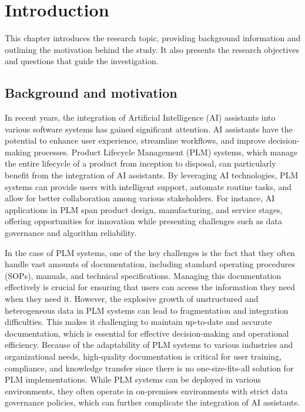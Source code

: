 \chapter{Introduction}
\label{ch:introduction}

This chapter introduces the research topic, providing background information and outlining the motivation behind the study. It also presents the research objectives and questions that guide the investigation.

\section{Background and motivation}
\label{sec:background-and-motivation}

In recent years, the integration of Artificial Intelligence (AI) assistants into various software systems has gained significant attention. AI assistants have the potential to enhance user experience, streamline workflows, and improve decision-making processes. Product Lifecycle Management (PLM) systems, which manage the entire lifecycle of a product from inception to disposal\parencite{stark_product_2015}, can particularly benefit from the integration of AI assistants. By leveraging AI technologies, PLM systems can provide users with intelligent support, automate routine tasks, and allow for better collaboration among various stakeholders. For instance, AI applications in PLM span product design, manufacturing, and service stages, offering opportunities for innovation while presenting challenges such as data governance and algorithm reliability\parencite{wang_artificial_2021}.

In the case of PLM systems, one of the key challenges is the fact that they often handle vast amounts of documentation, including standard operating procedures (SOPs), manuals, and technical specifications. Managing this documentation effectively is crucial for ensuring that users can access the information they need when they need it. However, the explosive growth of unstructured and heterogeneous data in PLM systems can lead to fragmentation and integration difficulties\parencite{wang_artificial_2021}. This makes it challenging to maintain up-to-date and accurate documentation, which is essential for effective decision-making and operational efficiency. Because of the adaptability of PLM systems to various industries and organizational needs, high-quality documentation is critical for user training, compliance, and knowledge transfer since there is no one-size-fits-all solution for PLM implementations\parencite{stark_product_2015-1}. While PLM systems can be deployed in various environments\parencite{stark_product_2015-1}, they often operate in on-premises environments with strict data governance policies, which can further complicate the integration of AI assistants.

